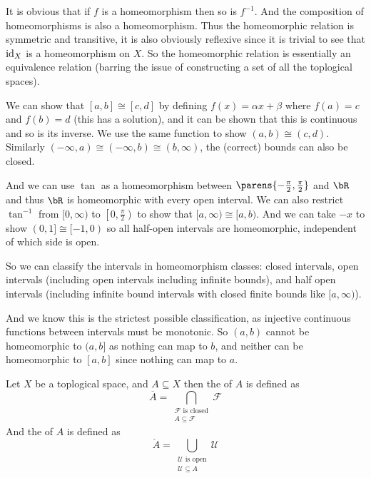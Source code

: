 \documentclass[10pt]{article}
\def\mU{\mathcal{U}}
\def\mF{\mathcal{F}}
\begin{document}
It is obvious that if $f$ is a homeomorphism then so is $f^{-1}$.
And the composition of homeomorphisms is also a homeomorphism.
Thus the homeomorphic relation is symmetric and transitive, it is also obviously reflexive since it is trivial to see that ${\rm id}_X$ is a homeomorphism on $X$.
So the homeomorphic relation is essentially an equivalence relation (barring the issue of constructing a set of all the toplogical spaces).

\begin{exam*}

    We can show that $[a,b]\cong[c,d]$ by defining $f(x)=\alpha x+\beta$ where $f(a)=c$ and $f(b)=d$ (this has a solution), and it can be shown that this is continuous and so is its inverse.
    We use the same function to show $(a,b)\cong(c,d)$.
    Similarly $(-\infty,a)\cong(-\infty,b)\cong(b,\infty)$, the (correct) bounds can also be closed.

    And we can use $\tan$ as a homeomorphism between $\parens{-\frac\pi2,\frac\pi2}$ and $\bR$ and thus $\bR$ is homeomorphic with every open interval.
    We can also restrict $\tan^{-1}$ from $[0,\infty)$ to $\left[0,\frac\pi2\right)$ to show that $[a,\infty)\cong[a,b)$.
    And we can take $-x$ to show $(0,1]\cong[-1,0)$ so all half-open intervals are homeomorphic, independent of which side is open.

    So we can classify the intervals in homeomorphism classes: closed intervals, open intervals (including open intervals including infinite bounds), and half open intervals (including infinite bound
    intervals with closed finite bounds like $[a,\infty)$).

    And we know this is the strictest possible classification, as injective continuous functions between intervals must be monotonic.
    So $(a,b)$ cannot be homeomorphic to $(a,b]$ as nothing can map to $b$, and neither can be homeomorphic to $[a,b]$ since nothing can map to $a$.

\end{exam*}

\begin{defn*}

    Let $X$ be a toplogical space, and $A\subseteq X$ then the  of $A$ is defined as
    \[ \overline A = \bigcap_{\substack{\mF\text{ is closed}\\ A\subseteq\mF}}\mF \]
    And the  of $A$ is defined as
    \[ \mathring A = \bigcup_{\substack{\mU\text{ is open}\\ \mU\subseteq A}}\mU \]

\end{defn*}
\end{document}
